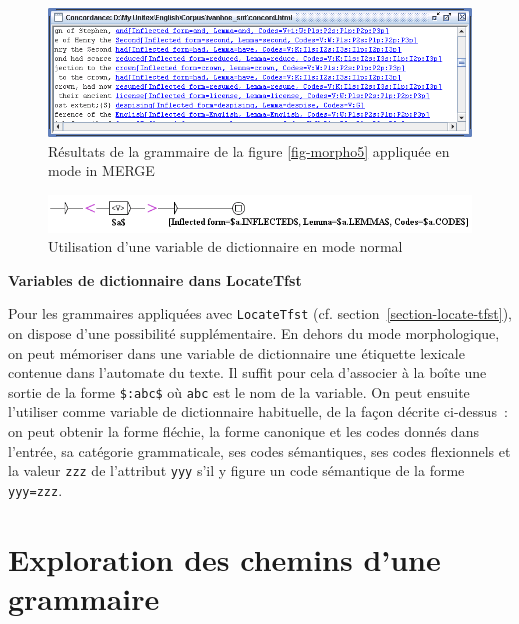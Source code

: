 \begin{figure}[!ht]
\begin{center}
\includegraphics[width=15cm]{resources/img/fig6-17p.png}
\caption{Résultats de la  grammaire de la figure \ref{fig-morpho5} appliquée en mode in MERGE
\label{fig-morpho6}}
\end{center}
\end{figure}

\begin{figure}[!ht]
\begin{center}
\includegraphics[width=15.5cm]{resources/img/fig6-17q.png}
\caption{Utilisation d'une variable de dictionnaire en mode normal\label{fig-morpho7}}
\end{center}
\end{figure}


\bigskip
\noindent \textbf{Variables de dictionnaire dans LocateTfst}

\noindent Pour les grammaires appliquées avec \verb+LocateTfst+ (cf. section~\ref{section-locate-tfst}), on dispose d'une possibilité
supplémentaire. 
En dehors du mode morphologique, on peut mémoriser dans une variable de dictionnaire
une étiquette lexicale contenue dans l'automate du texte.
Il suffit pour cela d'associer à la boîte une sortie de la forme \verb+$:abc$+ où \verb+abc+
est le nom de la variable.
On peut ensuite l'utiliser comme variable de dictionnaire habituelle, de la façon décrite ci-dessus~:
on peut obtenir la forme fléchie, la forme canonique et les codes donnés dans l'entrée, sa
catégorie grammaticale, ses codes sémantiques, ses codes flexionnels et la valeur
 \verb+zzz+ de l'attribut \verb+yyy+ s'il y figure un  code sémantique de la forme \verb+yyy=zzz+.


\section{Exploration des chemins d’une grammaire}

